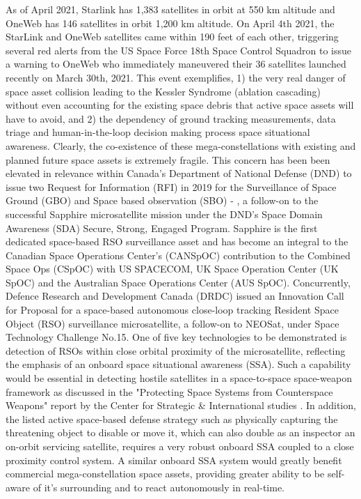 As of April 2021, Starlink has 1,383 satellites in orbit at 550 km altitude and OneWeb has 146 satellites in orbit 1,200 km altitude. On April 4th 2021, the StarLink and OneWeb satellites came within 190 feet of each other, triggering several red alerts from the US Space Force 18th Space Control Squadron to issue a warning to OneWeb who immediately maneuvered their 36 satellites launched recently on March 30th, 2021\footnotemark{}. This event exemplifies, 1) the very real danger of space asset collision leading to the Kessler Syndrome (ablation cascading) \cite{KesslerSyndrome78} without even accounting for the existing space debris that active space assets will have to avoid, and 2) the dependency of ground tracking measurements, data triage and human-in-the-loop decision making process space situational awareness. Clearly, the co-existence of these mega-constellations with existing and planned future space assets is extremely fragile.
This concern has been been elevated in relevance within Canada's Department of National Defense (DND) to issue two Request for Information (RFI) in 2019 for the Surveillance of Space Ground (GBO) and Space based observation (SBO) \cite{dndRfi19a} - \cite{dndRfi19b}, a follow-on to the successful Sapphire microsatellite mission under the DND's Space Domain Awareness (SDA) Secure, Strong, Engaged Program. Sapphire is the first dedicated space-based RSO surveillance asset and has become an integral to the Canadian Space Operations Center's (CANSpOC) contribution to the Combined Space Ops (CSpOC) with US SPACECOM,  UK Space Operation Center (UK SpOC) and the Australian Space Operations Center (AUS SpOC). Concurrently, Defence Research and Development Canada (DRDC) issued an Innovation Call for Proposal  \cite{drdcCall19} for a space-based autonomous close-loop tracking Resident Space Object (RSO) surveillance microsatellite, a follow-on to NEOSat, under Space Technology Challenge No.15. One of five key technologies to be demonstrated is detection of RSOs within close orbital proximity of the microsatellite, reflecting the emphasis of an onboard space situational awareness (SSA). Such a capability would be essential in detecting hostile satellites in a space-to-space space-weapon framework as discussed in the "Protecting Space Systems from Counterspace Weapons" report by the Center for Strategic \& International studies \cite{darkArts21}. In addition, the listed active space-based defense strategy such as physically capturing the threatening object to disable or move it, which can also double as an inspector an on-orbit servicing satellite, requires a very robust onboard SSA coupled to a close proximity control system. A similar onboard SSA system would greatly benefit commercial mega-constellation space assets, providing greater ability to be self-aware of it's surrounding and to react autonomously in real-time.

